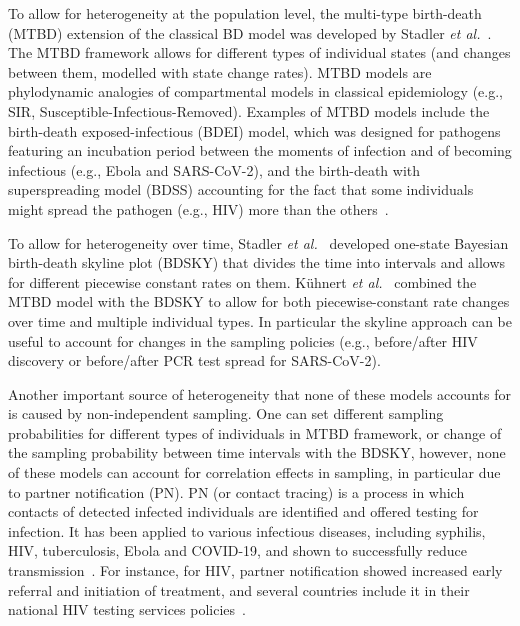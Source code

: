 \documentclass[10pt,letterpaper]{article}
\begin{document}
To allow for heterogeneity at the population level, the multi-type birth-death (MTBD) extension of the classical BD model was developed by Stadler \textit{et al.}~\cite{Stadler2013a}. The MTBD framework allows for different types of individual states (and changes between them, modelled with state change rates). MTBD models are phylodynamic analogies of compartmental models in classical epidemiology (e.g., SIR, Susceptible-Infectious-Removed).  Examples of MTBD models include the birth-death exposed-infectious (BDEI) model, which was designed for pathogens featuring an incubation period between the moments of infection and of becoming infectious (e.g., Ebola and SARS-CoV-2), and the birth-death with superspreading model (BDSS) accounting for the fact that some individuals might spread the pathogen (e.g., HIV) more than the others~\cite{Stadler2014}.

To allow for heterogeneity over time, Stadler \textit{et al.}~\cite{Stadler2013} developed one-state Bayesian birth-death skyline plot (BDSKY) that divides the time into intervals and allows for different piecewise constant rates on them. Kühnert \textit{et al.}~\cite{Kuhnert2016} combined the MTBD model with the BDSKY to allow for both piecewise-constant rate changes over time and multiple individual types. In particular the skyline approach can be useful to account for changes in the sampling policies (e.g., before/after HIV discovery or before/after PCR test spread for SARS-CoV-2).


Another important source of heterogeneity that none of these models accounts for is caused by non-independent sampling. One can set different sampling probabilities for different types of individuals in MTBD framework, or change of the sampling probability between time intervals with the BDSKY, however, none of these models can account for correlation effects in sampling, in particular due to partner notification (PN). PN (or contact tracing) is a process in which contacts of detected infected individuals are identified and offered testing for infection. It has been applied to various infectious diseases, including syphilis, HIV, tuberculosis, Ebola and COVID-19, and shown to successfully reduce transmission~\cite{el-sadrContactTracingBarriers2022}. For instance, for HIV,  partner notification showed increased early referral and initiation of treatment, and several countries include it in their national HIV testing services policies~\cite{worldhealthorganizationCountryPolicyReview2016}. 

\bigskip
\end{document}
